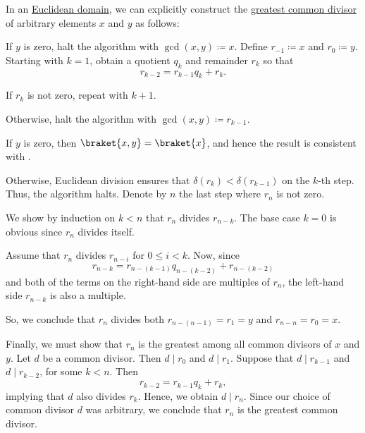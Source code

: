 \begin{algorithm}\label{alg:euclidean_algorithm}
  In an \hyperref[def:euclidean_domain]{Euclidean domain}, we can explicitly construct the \hyperref[def:gcd]{greatest common divisor} of arbitrary elements \( x \) and \( y \) as follows:
  \begin{thmenum}
     If \( y \) is zero, halt the algorithm with \( \gcd(x, y) \coloneqq x \).
     Define \( r_{-1} \coloneqq x \) and \( r_0 \coloneqq y \).
     Starting with \( k = 1 \), obtain a quotient \( q_k \) and remainder \( r_k \) so that
    \begin{equation*}
      r_{k-2} = r_{k-1} q_k + r_k.
    \end{equation*}

    If \( r_k \) is not zero, repeat  with \( k + 1 \).

    Otherwise, halt the algorithm with \( \gcd(x, y) \coloneqq r_{k-1} \).
  \end{thmenum}
\end{algorithm}
\begin{defproof}
  If \( y \) is zero, then \( \braket{ x, y } = \braket{ x } \), and hence the result is consistent with .

  Otherwise, Euclidean division ensures that \( \delta(r_k) < \delta(r_{k-1}) \) on the \( k \)-th step. Thus, the algorithm halts. Denote by \( n \) the last step where \( r_n \) is not zero.

  We show by induction on \( k < n \) that \( r_n \) divides \( r_{n-k} \). The base case \( k = 0 \) is obvious since \( r_n \) divides itself.

  Assume that \( r_n \) divides \( r_{n-i} \) for \( 0 \leq i < k \). Now, since
  \begin{equation*}
    r_{n-k} = r_{n-(k-1)} q_{n-(k-2)} + r_{n-(k-2)}
  \end{equation*}
  and both of the terms on the right-hand side are multiples of \( r_n \), the left-hand side \( r_{n-k} \) is also a multiple.

  So, we conclude that \( r_n \) divides both \( r_{n-(n-1)} = r_1 = y \) and \( r_{n-n} = r_0 = x \).

  Finally, we must show that \( r_n \) is the greatest among all common divisors of \( x \) and \( y \). Let \( d \) be a common divisor. Then \( d \mid r_0 \) and \( d \mid r_1 \). Suppose that \( d \mid r_{k-1} \) and \( d \mid r_{k-2} \), for some \( k < n \). Then
  \begin{equation*}
    r_{k-2} = r_{k-1} q_k + r_k,
  \end{equation*}
  implying that \( d \) also divides \( r_k \). Hence, we obtain \( d \mid r_n \). Since our choice of common divisor \( d \) was arbitrary, we conclude that \( r_n \) is the greatest common divisor.
\end{defproof}

